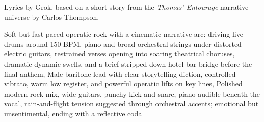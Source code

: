 
\begin{notes}
Lyrics by Grok, based on a short story from the \emph{Thomas’ Entourage} narrative universe by Carlos Thompson.
\end{notes}
\begin{style}
Soft but fast-paced operatic rock with a cinematic narrative arc: driving live drums around 150 BPM, piano and broad orchestral strings under distorted electric guitars, restrained verses opening into soaring theatrical choruses, dramatic dynamic swells, and a brief stripped-down hotel-bar bridge before the final anthem, Male baritone lead with clear storytelling diction, controlled vibrato, warm low register, and powerful operatic lifts on key lines, Polished modern rock mix, wide guitars, punchy kick and snare, piano audible beneath the vocal, rain-and-flight tension suggested through orchestral accents; emotional but unsentimental, ending with a reflective coda
\end{style}

